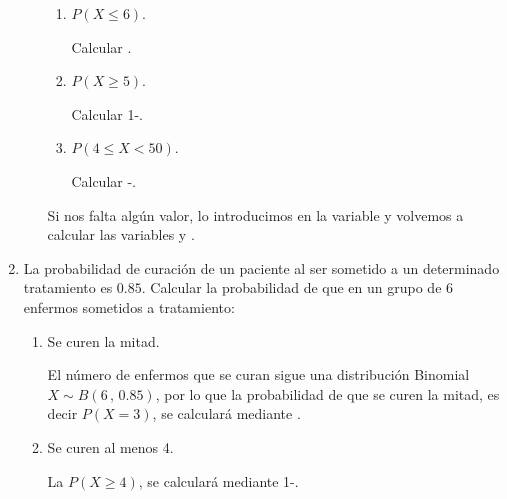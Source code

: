 \begin{enumerate}[leftmargin=*]
\begin{enumerate}
\begin{enumerate}
\item $P(X\leq 6)$.

\begin{indicacion}
Calcular .
\end{indicacion}

\item $P(X\geq 5)$.

\begin{indicacion}
Calcular 1-.
\end{indicacion}

\item $P(4\leq X < 50)$.

\begin{indicacion}
Calcular -.
\end{indicacion}

\end{enumerate}

\begin{indicacion}
Si nos falta algún valor, lo introducimos en la variable
 y volvemos a calcular las variables
 y .
\end{indicacion}

\end{enumerate}

\item La probabilidad de curación de un paciente al ser sometido a un determinado tratamiento es $0.85$. Calcular la probabilidad de que en un grupo de 6 enfermos sometidos a tratamiento:
\begin{enumerate}

\item Se curen la mitad.

\begin{indicacion}
El número de enfermos que se curan sigue una distribución Binomial $X\sim B(6\,,\,0.85)$, 
por lo que la probabilidad de que se curen la mitad, es decir $P(X=3)$, se calculará 
mediante .
\end{indicacion}

\item Se curen al menos 4.
\begin{indicacion}
La $P(X\geq 4)$, se calculará 
mediante 1-.
\end{indicacion}

\end{enumerate}


\end{enumerate}
